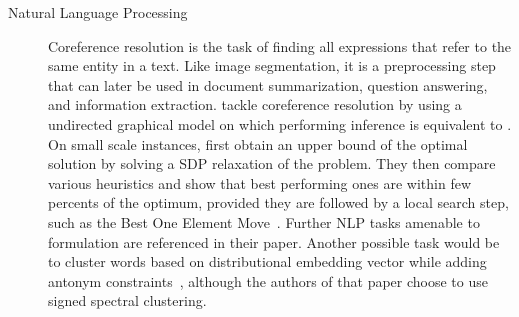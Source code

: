 \begin{description}
   \item[Natural Language Processing] 
      Coreference resolution is the task of finding all expressions that refer to the same entity in
      a text. Like image segmentation, it is a preprocessing step that can later be used in document
      summarization, question answering, and information extraction. \Textcite[Section
      2.3]{graphicalCoreference04} tackle coreference resolution by using a undirected graphical
      model on which performing inference is equivalent to \pcc{}. On small scale instances,
      \textcite{Elsner2009} first obtain an upper bound of the optimal solution by solving a SDP
      relaxation of the problem. They then compare various heuristics and show that best performing
      ones are within few percents of the optimum, provided they are followed by a local search
      step, such as the Best One Element Move~\autocite{Gionis2007}. Further NLP tasks amenable to
      \pcc{} formulation are referenced in their paper. Another possible task would be 
      to cluster words based on distributional embedding vector while adding antonym
      constraints~\autocite{SignedWordRatings}, although the authors of that paper choose to use
      signed spectral clustering.


\end{description}
